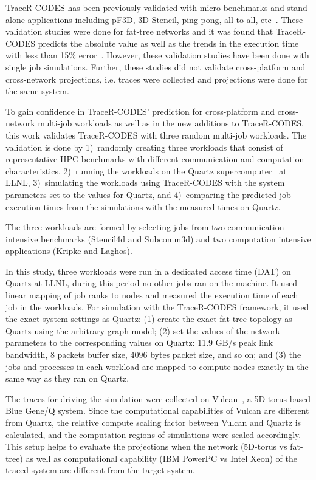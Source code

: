 
TraceR-CODES has been previously validated with micro-benchmarks and stand alone
applications including pF3D, 3D Stencil, ping-pong, all-to-all,
etc~\cite{Jain:sc2017}. These validation studies were done for fat-tree networks
and it was found that TraceR-CODES predicts the absolute value as well as the
trends in the execution time with less than 15\%
error~\cite{Jain:sc2017,acun:padabs2015}.  However, these validation studies 
have been done with single job simulations. Further, these studies did not
validate cross-platform and cross-network projections, i.e. traces were
collected and projections were done for the same system.

To gain confidence in TraceR-CODES' prediction for cross-platform and
cross-network multi-job workloads as well
as in the new additions to TraceR-CODES, this work validates TraceR-CODES with three random
multi-job workloads.
The validation is done by 1)~randomly creating three workloads that consist of 
representative HPC benchmarks with different communication and computation
characteristics, 2)~running the workloads on the Quartz supercomputer~\cite{quartz} at LLNL,
3)~simulating the workloads using TraceR-CODES with the system parameters
set to the values for Quartz, and 4)~comparing the predicted job execution
times from the simulations with the measured times on Quartz. 

The three workloads are formed by selecting jobs from two communication intensive
benchmarks (Stencil4d and Subcomm3d) and two computation intensive applications
(Kripke and Laghos). 

In this study, three workloads were run in a dedicated access time (DAT) on Quartz at LLNL, during this period
no other jobs ran on the machine. It used linear mapping of job
ranks to nodes and measured the execution time of each job in the workloads.
For simulation with the TraceR-CODES framework, it used the
exact system settings as Quartz: (1)  create
the exact fat-tree topology as Quartz using the arbitrary graph model; (2)
 set the values of the network parameters to the corresponding values on Quartz:
11.9 GB/s peak link bandwidth, 8 packets buffer size, 4096 bytes packet size,
and so on; and (3) the jobs and processes in each workload
are mapped to compute nodes exactly in the same
way as they ran on Quartz. 

The traces for driving the simulation were collected on
Vulcan~\cite{vulcan}, a 5D-torus based Blue Gene/Q
system.  Since the computational capabilities of Vulcan are different from
Quartz, the relative compute scaling factor between Vulcan and
Quartz is calculated, and the computation regions of simulations were scaled accordingly. This
setup helps to evaluate the projections when the network (5D-torus vs fat-tree)
as well as computational capability (IBM PowerPC vs Intel Xeon) of the traced
system are different from the target system.

